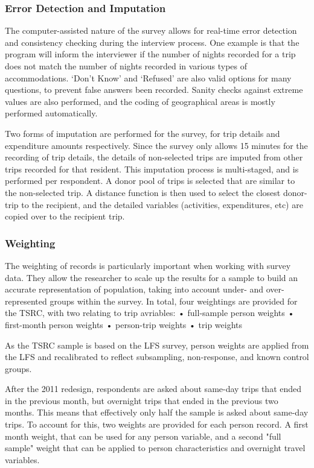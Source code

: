 \subsubsection{Error Detection and Imputation}
The computer-assisted nature of the survey allows for real-time error detection and consistency checking during the interview process. One example is that the program will inform the interviewer if the number of nights recorded for a trip does not match the number of nights recorded in various types of accommodations. ‘Don’t Know’ and ‘Refused’ are also valid options for many questions, to prevent false answers been recorded. Sanity checks against extreme values are also performed, and the coding of geographical areas is mostly performed automatically.

Two forms of imputation are performed for the survey, for trip details and expenditure amounts respectively. Since the survey only allows 15 minutes for the recording of trip details, the details of non-selected trips are imputed from other trips recorded for that resident. This imputation process is multi-staged, and is performed per respondent. A donor pool of trips is selected that are similar to the non-selected trip. A distance function is then used to select the closest donor-trip to the recipient, and the detailed variables (activities, expenditures, etc) are copied over to the recipient trip.

\subsubsection{Weighting}
The weighting of records is particularly important when working with survey data. They allow the researcher to scale up the results for a sample to build an accurate representation of population, taking into account under- and over- represented groups within the survey. In total, four weightings are provided for the TSRC, with two relating to trip avriables:
•	full-sample person weights
•	first-month person weights
•	person-trip weights
•	trip weights

As the TSRC sample is based on the LFS survey, person weights are applied from the LFS and recalibrated to reflect subsampling, non-response, and known control groups. 

After the 2011 redesign, respondents are asked about same-day trips that ended in the previous month, but overnight trips that ended in the previous two months. This means that effectively only half the sample is asked about same-day trips. To account for this, two weights are provided for each person record. A first month weight, that can be used for any person variable, and a second "full sample" weight that can be applied to person characteristics and overnight travel variables.

